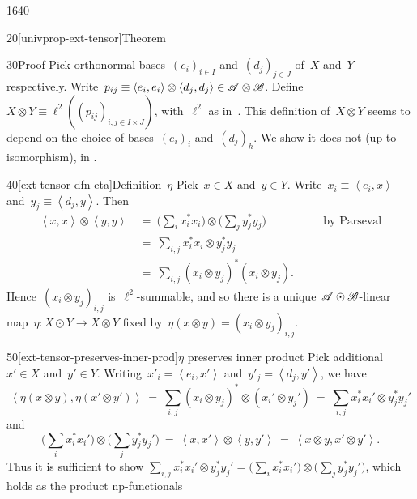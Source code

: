 \begin{parsec}{1640}
\begin{point}{20}[univprop-ext-tensor]{Theorem}
\begin{enumerate}
\end{enumerate}
\spacingfix{}
\begin{point}{30}{Proof}%
Pick orthonormal bases~$(e_i)_{i \in I}$ and~$(d_j)_{j \in J}$ of~$X$
    and~$Y$ respectively.
Write~$p_{ij} \equiv \left<e_i, e_i\right>\otimes \left<d_j,d_j\right>
    \in \mathscr{A} \otimes \mathscr{B}$.
Define~$X \otimes Y \equiv \ell^2((p_{ij})_{i,j \in I\times J})$,
    with~$\ell^2$ as in~.
This definition of~$X \otimes Y$ seems to depend
    on the choice of bases~$(e_i)_i$ and~$(d_j)_h$.
    We show it does not (up-to-isomorphism), in .
\begin{point}{40}[ext-tensor-dfn-eta]{Definition~$\eta$}%
Pick~$x \in X$ and~$y \in Y$.
Write~$x_i \equiv \left<e_i, x\right>$
and~$y_j \equiv \left<d_j, y\right>$.
Then
\begin{align*}
    \left<x,x\right> \otimes \left<y,y\right>
    &\ = \ \bigl( \sum_i x_i^*x_i\bigr) \otimes\bigl(\sum_jy_j^*y_j\bigr)
            &\quad&\text{by Parseval}  \\
            &\ = \ \sum_{i,j}  x_i^*x_i  \otimes y_j^*y_j \\
            &\ = \ \sum_{i,j}  (x_i \otimes y_j)^* (x_i  \otimes y_j).
\end{align*}
Hence~$(x_i \otimes y_j)_{i,j}$ is~$\ell^2$-summable,
    and so there is a unique~$\mathscr{A} \odot\mathscr{B}$-linear
    map~$\eta\colon X \odot Y \to X \otimes Y$ fixed
    by~$\eta(x \otimes y) = (x_i \otimes y_j)_{i,j}$.
\end{point}
\begin{point}{50}[ext-tensor-preserves-inner-prod]{$\eta$ preserves inner product}%
Pick additional~$x' \in X$ and~$y' \in Y$.
Writing~$x'_i = \left<e_i,x'\right>$
    and~$y'_j = \left<d_j, y'\right>$,
we have
\begin{equation*}
    \left<\eta(x\otimes y), \eta(x' \otimes y')\right>
    \ = \ \sum_{i,j} (x_i\otimes y_j)^* \otimes (x_i' \otimes y_j')
    \ = \ \sum_{i,j} x_i^*x_i' \otimes y_j^* y_j'
\end{equation*}
and
\begin{equation*}
    \bigl(\sum_i x_i^*x_i'\bigr) \otimes \bigl( \sum_j y_j^* y_j' \bigr)
    \ = \ \left<x,x'\right> \otimes \left<y,y'\right>
    \ = \ \left<x\otimes y,x' \otimes y'\right> .
\end{equation*}
Thus it is sufficient to show
    $\sum_{i,j} x_i^*x_i' \otimes y_j^* y_j'
    = \bigl(\sum_i x_i^*x_i'\bigr) \otimes \bigl( \sum_j y_j^* y_j' \bigr)$,
    which holds as the product np-functionals

\end{point}
\end{point}
\end{point}
\end{parsec}
